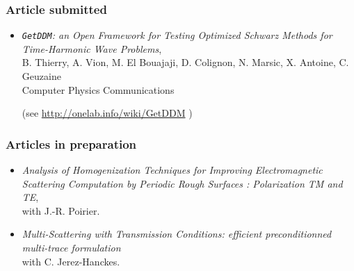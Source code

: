 \documentclass[a4paper,10pt,twoside]{article}
\begin{document}
\subsubsection*{Article submitted}
\begin{itemize}
\item[\textbullet]
  \emph{\texttt{GetDDM}: an Open Framework for Testing Optimized Schwarz
    Methods for Time-Harmonic Wave Problems},\\
  B. Thierry, A. Vion, M. El Bouajaji,
  D. Colignon, N. Marsic, X. Antoine, C. Geuzaine\\
  \textsf{Computer Physics Communications}
  \begin{flushright}
    (see \url{http://onelab.info/wiki/GetDDM} )
  \end{flushright}
\end{itemize}

\vspace{-0.25cm}

\subsubsection*{Articles in preparation}
\begin{itemize}
\item[\textbullet]
\emph{Analysis of
  Homogenization Techniques for Improving Electromagnetic Scattering
  Computation by Periodic Rough Surfaces : Polarization TM and TE},\\
with \textsf{J.-R. Poirier}.
\item[\textbullet]
  \emph{Multi-Scattering with Transmission Conditions: efficient
    preconditionned multi-trace formulation}\\
  with \textsf{C. Jerez-Hanckes}.
\end{itemize}

\vspace{-0.25cm}
\end{document}
